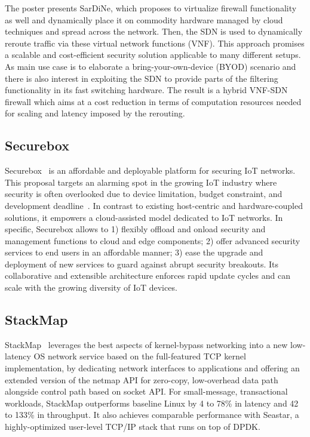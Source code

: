 The poster presents SarDiNe, which proposes to virtualize firewall
functionality as well and dynamically place it on commodity hardware managed
by cloud techniques and spread across the network. Then, the SDN is used to
dynamically reroute traffic via these virtual network functions (VNF). This
approach promises a scalable and cost-efficient security solution applicable to
many different setups. As main use case is to elaborate a
bring-your-own-device (BYOD) scenario and there is also interest in exploiting
the \ac{SDN} to provide parts of the filtering functionality in its fast
switching hardware. The result is a hybrid VNF-SDN firewall which aims at a
cost reduction in terms of computation resources needed for scaling and
latency imposed by the rerouting.

\subsection{Securebox}

Securebox~\cite{hafeez:s3:2015, hafeez:can:2016} is an affordable and
deployable platform for securing IoT networks. This proposal
targets an alarming spot in the growing IoT industry where security is
often overlooked due to device limitation, budget constraint, and development
deadline~\cite{haus:comst:2017}. In contrast to existing host-centric and
hardware-coupled solutions, it empowers a cloud-assisted model dedicated to
IoT networks. In specific, Securebox allows to 1) flexibly
offload and onload security and management functions to cloud and 
edge components; 2) offer advanced security services to end
users in an affordable manner; 3) ease the upgrade and
deployment of new services to guard against abrupt security breakouts. Its
collaborative and extensible architecture enforces rapid update cycles and can
scale with the growing diversity of IoT devices.

\subsection{StackMap}

StackMap~\cite{kyasukata:atc:2016} leverages the best aspects of kernel-bypass
networking into a new low-latency OS network service based on the
full-featured TCP kernel implementation, by dedicating network interfaces to
applications and offering an extended version of the netmap API for zero-copy,
low-overhead data path alongside control path based on socket API\@. For
small-message, transactional workloads, StackMap outperforms baseline Linux by
4 to 78\% in latency and 42 to 133\% in throughput.  It also achieves
comparable performance with Seastar, a highly-optimized user-level TCP/IP
stack that runs on top of DPDK\@.

